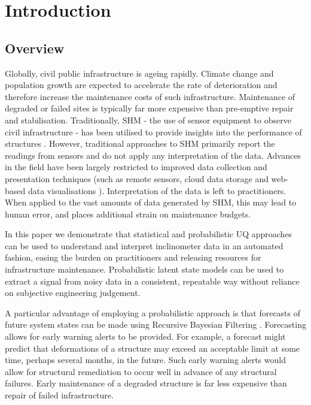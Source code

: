 \documentclass[pamm,a4paper,fleqn]{w-art}
\begin{document}
\maketitle

\section{Introduction}

\subsection{Overview}

Globally, civil public infrastructure is ageing rapidly. Climate change and population growth are expected to accelerate the rate of deterioration and therefore increase the maintenance costs of such infrastructure. Maintenance of degraded or failed sites is typically far more expensive than pre-emptive repair and stabilisation. Traditionally, SHM - the use of sensor equipment to observe civil infrastructure - has been utilised to provide insights into the performance of structures \cite{soga2016infrastructure}. However, traditional approaches to SHM primarily report the readings from sensors and do not apply any interpretation of the data. Advances in the field have been largely restricted to improved data collection and presentation techniques (such as remote sensors, cloud data storage and web-based data visualisations \cite{II}). Interpretation of the data is left to practitioners. When applied to the vast amounts of data generated by SHM, this may lead to human error, and places additional strain on maintenance budgets.

In this paper we demonstrate that statistical and probabilistic UQ approaches can be used to understand and interpret inclinometer data in an automated fashion, easing the burden on practitioners and releasing resources for infrastructure maintenance. Probabilistic latent state models can be used to extract a signal from noisy data in a consistent, repeatable way without reliance on subjective engineering judgement. 

A particular advantage of employing a probabilistic approach is that forecasts of future system states can be made using Recursive Bayesian Filtering \cite{murphy2012machine, sarkka2013bayesian, russell2010artificial}. Forecasting allows for early warning alerts to be provided. For example, a forecast might predict that deformations of a structure may exceed an acceptable limit at some time, perhaps several months, in the future. Such early warning alerts would allow for structural remediation to occur well in advance of any structural failures. Early maintenance of a degraded structure is far less expensive than repair of failed infrastructure.
\end{document}
